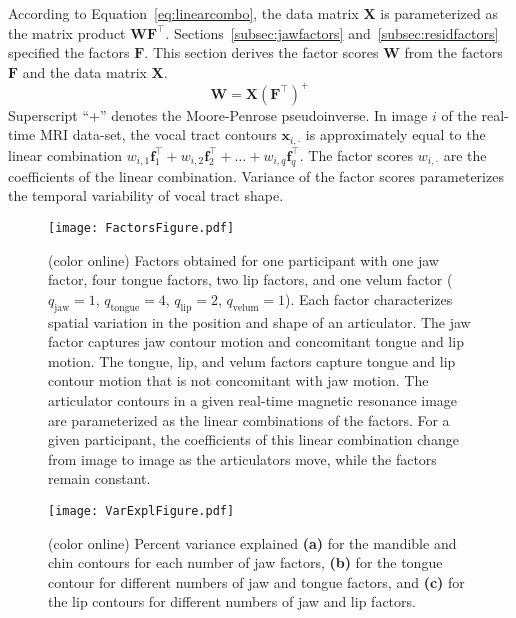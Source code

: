 \documentclass[reprint]{JASAnew}\usepackage[]{graphicx}\usepackage[]{color}
\begin{document}
According to Equation~\ref{eq:linearcombo}, the data matrix $\mathbf{X}$ is parameterized as the matrix product $\mathbf{W}\mathbf{F}^\intercal$. 
%
Sections~\ref{subsec:jawfactors} and~\ref{subsec:residfactors} specified the factors $\mathbf{F}$. 
%
This section derives the factor scores $\mathbf{W}$ from the factors $\mathbf{F}$ and the data matrix $\mathbf{X}$. 
%
\begin{equation}
\mathbf{W} 
 = \mathbf{X} \left( \mathbf{F}^\intercal \right) ^+
\end{equation}
%
Superscript ``+'' denotes the Moore-Penrose pseudoinverse.
%
In image $i$ of the real-time MRI data-set, the vocal tract contours $\mathbf{x}_{i,\cdot}$ is approximately equal to the linear combination $w_{i,1} \mathbf{f}_1^\intercal + w_{i,2} \mathbf{f}_2^\intercal + \ldots + w_{i,q} \mathbf{f}_q^\intercal$. The factor scores $w_{i,\cdot }$ are the coefficients of the linear combination. Variance of the factor scores parameterizes the temporal variability of vocal tract shape. 

\begin{figure}

\texttt{[image: FactorsFigure.pdf]}

\caption{(color online) Factors obtained for one participant with one jaw factor, four tongue factors, two lip factors, and one velum factor ($q_\text{jaw} = 1$, $q_\text{tongue} = 4$, $q_\text{lip} = 2$, $q_\text{velum} = 1$). 
Each factor characterizes spatial variation in the position and shape of an articulator. 
The jaw factor captures jaw contour motion and concomitant tongue and lip motion.
The tongue, lip, and velum factors capture tongue and lip contour motion that is not concomitant with jaw motion. 
The articulator contours in a given real-time magnetic resonance image are parameterized as the linear combinations of the factors. 
For a given participant, the coefficients of this linear combination change from image to image as the articulators move, while the factors remain constant.}
\label{fig:gfa}
\end{figure}

\begin{figure*}

\texttt{[image: VarExplFigure.pdf]}

\caption{(color online) Percent variance explained {\bf (a)} for the mandible and chin contours for each number of jaw factors, {\bf (b)} for the tongue contour for different numbers of jaw and tongue factors, and {\bf (c)} for the lip contours for different numbers of jaw and lip factors.}
\label{fig:varexpl}
\end{figure*}
\end{document}
